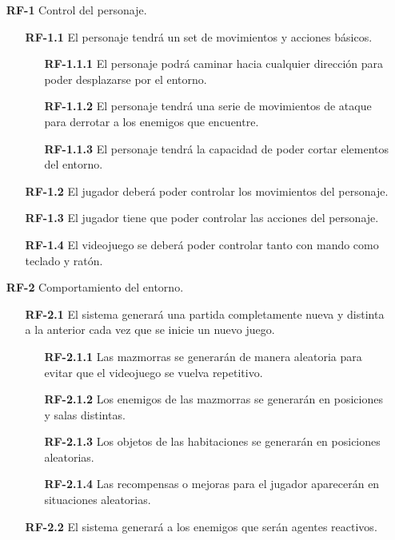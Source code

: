 \begin{enumerate}
    \item[\textbf{RF-1}] Control del personaje.
    \begin{enumerate}
        \item[\textbf{RF-1.1}] El personaje tendrá un set de movimientos y acciones básicos.
        \begin{enumerate}
            \item[\textbf{RF-1.1.1}] El personaje podrá caminar hacia cualquier dirección para poder desplazarse por el entorno.
            \item[\textbf{RF-1.1.2}] El personaje tendrá una serie de  movimientos de ataque para derrotar a los enemigos que encuentre.
            \item[\textbf{RF-1.1.3}] El personaje tendrá la capacidad de poder cortar elementos del entorno.
        \end{enumerate}
        \item[\textbf{RF-1.2}] El jugador deberá poder controlar los movimientos del personaje.
        \item[\textbf{RF-1.3}] El jugador tiene que poder controlar las acciones del personaje.
        \item[\textbf{RF-1.4}] El videojuego se deberá poder controlar tanto con mando como teclado y ratón.
    \end{enumerate}
    \item[\textbf{RF-2}] Comportamiento del entorno.
    \begin{enumerate}
        \item[\textbf{RF-2.1}] El sistema generará una partida completamente nueva y distinta a la anterior cada vez que se inicie un nuevo juego.
        \begin{enumerate}
            \item[\textbf{RF-2.1.1}] Las mazmorras se generarán de manera aleatoria para evitar que el videojuego se vuelva repetitivo.
            \item[\textbf{RF-2.1.2}] Los enemigos de las mazmorras se generarán en posiciones y salas distintas.
            \item[\textbf{RF-2.1.3}] Los objetos de las habitaciones se generarán en posiciones aleatorias.
            \item[\textbf{RF-2.1.4}] Las recompensas o mejoras para el jugador aparecerán en situaciones aleatorias.
        \end{enumerate}
        \item[\textbf{RF-2.2}] El sistema generará a los enemigos que serán agentes reactivos.

\end{enumerate}
\end{enumerate}
